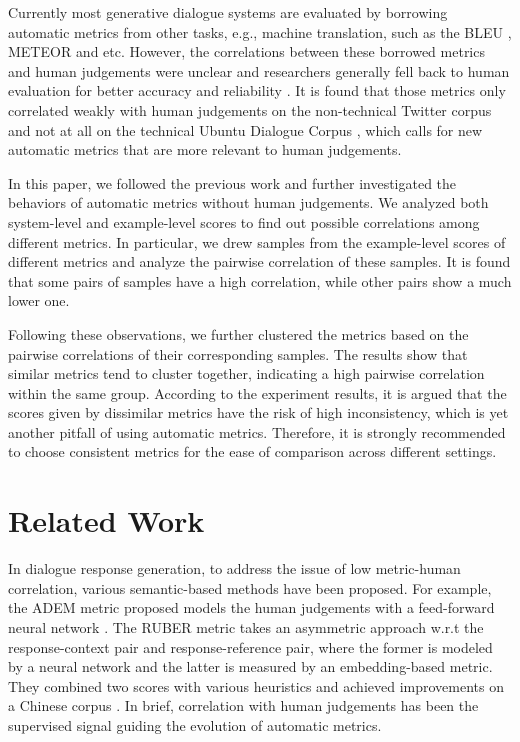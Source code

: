 \documentclass[runningheads]{llncs}
\begin{document}
Currently most generative dialogue systems are evaluated by borrowing automatic metrics from other tasks, e.g., machine translation, such as the BLEU \cite{BLEU}, METEOR \cite{METEOR} and etc. However, the correlations between these borrowed metrics and human judgements were unclear and researchers generally fell back to human evaluation for better accuracy and reliability \cite{VHRED,Shang}. It is found that those metrics only correlated weakly with human judgements on the non-technical Twitter corpus and not at all on the technical Ubuntu Dialogue Corpus \cite{HowNot}, which calls for new automatic metrics that are more relevant to human judgements.

In this paper, we followed the previous work and further investigated the behaviors of automatic metrics without human judgements. We analyzed both system-level and example-level scores to find out possible correlations among different metrics. In particular, we drew samples from the example-level scores of different metrics and analyze the pairwise correlation of these samples. It is found that some pairs of samples have a high correlation, while other pairs show a much lower one.

Following these observations, we further clustered the metrics based on the pairwise correlations of their corresponding samples. The results show that similar metrics tend to cluster together, indicating a high pairwise correlation within the same group. According to the experiment results, it is argued that the scores given by dissimilar metrics have the risk of high inconsistency, which is yet another pitfall of using automatic metrics. Therefore, it is strongly recommended to choose consistent metrics for the ease of comparison across different settings.

\section{Related Work}
In dialogue response generation, to address the issue of low metric-human correlation, various semantic-based methods have been proposed. For example, the ADEM metric proposed models the human judgements with a feed-forward neural network \cite{ADEM}. The RUBER metric takes an asymmetric approach w.r.t the response-context pair and response-reference pair, where the former is modeled by a neural network and the latter is measured by an embedding-based metric. They combined two scores with various heuristics and achieved improvements on a Chinese corpus \cite{RUBER}. In brief, correlation with human judgements has been the supervised signal guiding the evolution of automatic metrics.
\end{document}
